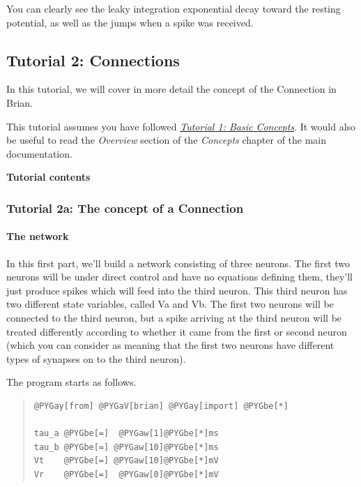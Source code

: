 \documentclass[letterpaper,10pt]{manual}
\begin{document}
You can clearly see the leaky integration exponential decay
toward the resting potential, as well as the jumps when a
spike was received.

\resetcurrentobjects


\hypertarget{tutorial2-connections}{}\subsection{Tutorial 2: Connections}

In this tutorial, we will cover in more detail the concept of the Connection
in Brian.

This tutorial assumes you have followed \hyperlink{tutorial1-basic-concepts}{\emph{Tutorial 1: Basic Concepts}}. It would
also be useful to read the \emph{Overview} section of the \emph{Concepts} chapter of
the main documentation.

\textbf{Tutorial contents}

\resetcurrentobjects


\subsubsection{Tutorial 2a: The concept of a Connection}


\paragraph{The network}

In this first part, we'll build a network consisting of three neurons. The
first two neurons will be under direct control and have no equations
defining them, they'll just produce spikes which will feed into the third
neuron. This third neuron has two different state variables, called Va
and Vb. The first two neurons will be connected to the third neuron, but
a spike arriving at the third neuron will be treated differently
according to whether it came from the first or second neuron (which you
can consider as meaning that the first two neurons have different
types of synapses on to the third neuron).

The program starts as follows.
\begin{quote}

\begin{Verbatim}[commandchars=@\[\]]
@PYGay[from] @PYGaV[brian] @PYGay[import] @PYGbe[*]

tau_a @PYGbe[=]  @PYGaw[1]@PYGbe[*]ms
tau_b @PYGbe[=] @PYGaw[10]@PYGbe[*]ms
Vt    @PYGbe[=] @PYGaw[10]@PYGbe[*]mV
Vr    @PYGbe[=]  @PYGaw[0]@PYGbe[*]mV
\end{Verbatim}
\end{quote}
\end{document}
